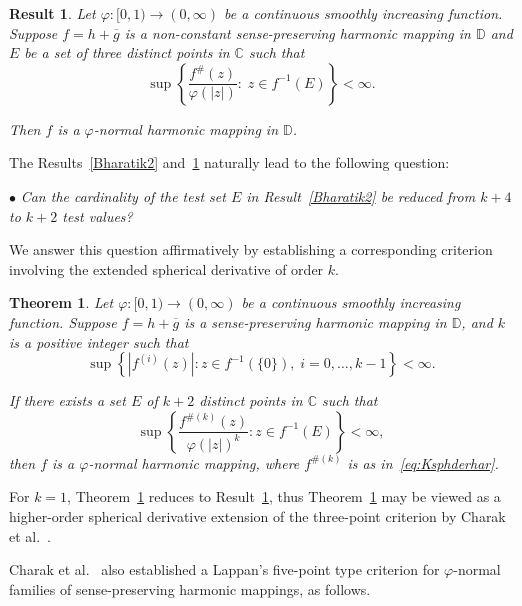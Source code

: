 \documentclass[11pt, reqno]{amsart}
\numberwithin{equation}{section}
\theoremstyle{definition}
\theoremstyle{remark}
\theoremstyle{plain}
\newtheorem{theorem}{Theorem}[section]
\newtheorem{result}{Result}[section]
\begin{document}
\begin{result}\label{threevaluefunction}\cite[Theorem 1.13]{charakbharti}
Let $\varphi:[0,1)\to(0,\infty)$ be a continuous smoothly increasing
function. Suppose $f=h+\overline{g}$ is a non-constant sense-preserving
 harmonic mapping in $\mathbb{D}$ and $E$
  be a set of three distinct points in $\mathbb{C}$ such that
\[
\sup\left\{
\frac{f^{\#}(z)}{\varphi(|z|)}
:\;
z\in f^{-1}(E)
\right\}
<\infty.
\]

Then $f$ is a $\varphi$-normal harmonic mapping 
in $\mathbb{D}$.
\end{result}

The Results~\ref{Bharatik2} and~\ref{threevaluefunction} naturally 
lead to the following question:\smallskip

$\bullet$ {\it Can the cardinality of the test set $E$
 in Result~\ref{Bharatik2} be reduced from $k+4$ 
to $k+2$ test values?} \smallskip

We answer this question affirmatively 
by establishing a corresponding criterion involving the extended spherical
 derivative of order $k$.

\begin{theorem}\label{Mainfunction}
Let $\varphi:[0,1)\to(0,\infty)$ be a continuous smoothly 
increasing
function. Suppose
$f=h+\overline{g}$ is a sense-preserving harmonic
mapping in $\mathbb{D}$, and $k$ is a positive integer such that
\begin{equation}\label{eq:1MainfunHyp}
\sup\left\{
|f^{(i)}(z)|:
z\in f^{-1}(\{0\}),\;
i=0,\ldots,k-1
\right\}<\infty.
\end{equation}

If there exists a set $E$ of $k+2$ distinct 
points in $\mathbb{C}$ such that
\begin{equation}\label{eq:2MainfunHyp}
\sup\left\{
\frac{f^{\#(k)}(z)}{\varphi(|z|)^k}
:
z\in f^{-1}(E)
\right\}
<\infty,
\end{equation}
then $f$ is a $\varphi$-normal harmonic mapping, 
where $f^{\#(k)}$ is as in~\eqref{eq:Ksphderhar}.
\end{theorem}
\medskip

For $k=1$, Theorem~\ref{Mainfunction} reduces to
Result~\ref{threevaluefunction}, thus Theorem~\ref{Mainfunction}
may be viewed as a higher-order spherical derivative extension of the 
three-point criterion by Charak et al.~\cite{charakbharti}.
 \smallskip
 
 Charak et al.~\cite{charakbharti} also established a Lappan's five-point type 
 criterion for $\varphi$-normal families of sense-preserving harmonic mappings,
 as follows.
 
\end{document}
